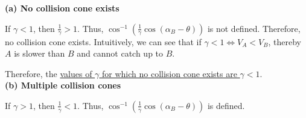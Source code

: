 \textbf{(a) No collision cone exists}

If \( \gamma < 1 \), then \( \frac{1}{\gamma} > 1 \).
Thus, \( \cos^{-1} \left( \frac{1}{\gamma} \cos (\alpha_B - \theta) \right) \) is not defined.
Therefore, no collision cone exists.
Intuitively, we can see that if \( \gamma < 1 \iff V_A < V_B \), thereby \( A \) is slower than \( B \) and cannot catch up to \( B \).

Therefore, the \underline{values of \( \gamma \) for which no collision cone exists are \( \gamma < 1 \)}. \\
\textbf{(b) Multiple collision cones}

If \( \gamma > 1 \), then \( \frac{1}{\gamma} < 1 \).
Thus, \( \cos^{-1} \left( \frac{1}{\gamma} \cos (\alpha_B - \theta) \right) \) is defined.
